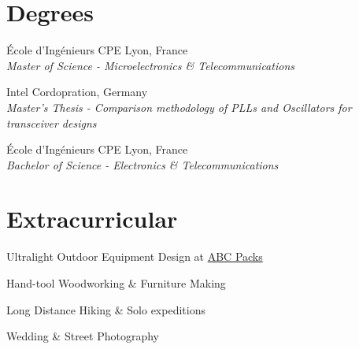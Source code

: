 \documentclass[10pt,a4paper]{moderncv}
\newcommand*{\makeeducationparagraph}[3]{
  {#2, #3}\\
  {\itshape #1}
  \par\addvspace{1em}
  }
\begin{document}
 \clearpage
    
\section{Degrees}

  \makeeducationparagraph{Master of Science - Microelectronics \& Telecommunications}
    {École d'Ingénieurs CPE Lyon}
    {France}

    \makeeducationparagraph{Master's Thesis - Comparison methodology of PLLs and Oscillators for transceiver designs}
    {Intel Cordopration}
    {Germany}

    \makeeducationparagraph{Bachelor of Science - Electronics \& Telecommunications}
    {École d'Ingénieurs CPE Lyon}
    {France}


\section{Extracurricular}

  Ultralight Outdoor Equipment Design at \href{https://abcpacks.com}{ABC Packs}
  \par Hand-tool Woodworking \& Furniture Making
  \par Long Distance Hiking \& Solo expeditions
  \par Wedding \& Street Photography

\clearpage


\end{document}
